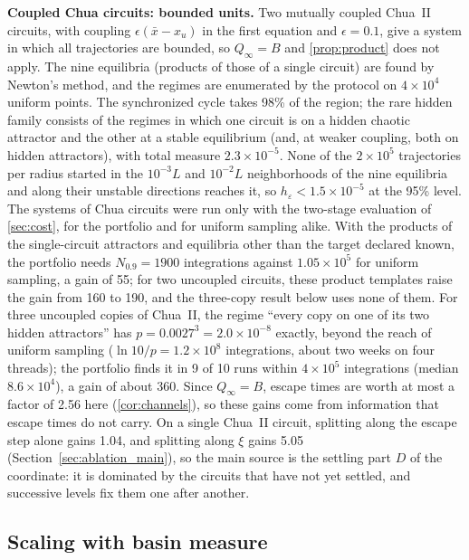 \textbf{Coupled Chua circuits: bounded units.} Two mutually coupled Chua~II circuits, with coupling $\epsilon(\bar x-x_u)$ in the first equation and $\epsilon=0.1$, give a system in which all trajectories are bounded, so $Q_\infty=B$ and \cref{prop:product} does not apply. The nine equilibria (products of those of a single circuit) are found by Newton's method, and the regimes are enumerated by the protocol on $4\times10^4$ uniform points. The synchronized cycle takes 98\% of the region; the rare hidden family consists of the regimes in which one circuit is on a hidden chaotic attractor and the other at a stable equilibrium (and, at weaker coupling, both on hidden attractors), with total measure $2.3\times10^{-5}$. None of the $2\times10^5$ trajectories per radius started in the $10^{-3}L$ and $10^{-2}L$ neighborhoods of the nine equilibria and along their unstable directions reaches it, so $h_\varepsilon<1.5\times10^{-5}$ at the 95\% level. The systems of Chua circuits were run only with the two-stage evaluation of \cref{sec:cost}, for the portfolio and for uniform sampling alike. With the products of the single-circuit attractors and equilibria other than the target declared known, the portfolio needs $N_{0.9}=1900$ integrations against $1.05\times10^5$ for uniform sampling, a gain of 55; for two uncoupled circuits, these product templates raise the gain from 160 to 190, and the three-copy result below uses none of them. For three uncoupled copies of Chua~II, the regime ``every copy on one of its two hidden attractors'' has $p=0.0027^3=2.0\times10^{-8}$ exactly, beyond the reach of uniform sampling ($\ln10/p=1.2\times10^8$ integrations, about two weeks on four threads); the portfolio finds it in 9 of 10 runs within $4\times10^5$ integrations (median $8.6\times10^4$), a gain of about 360. Since $Q_\infty=B$, escape times are worth at most a factor of 2.56 here (\cref{cor:channels}), so these gains come from information that escape times do not carry. On a single Chua~II circuit, splitting along the escape step alone gains 1.04, and splitting along $\xi$ gains 5.05 (Section~\ref{sec:ablation_main}), so the main source is the settling part $D$ of the coordinate: it is dominated by the circuits that have not yet settled, and successive levels fix them one after another.

\subsection{Scaling with basin measure}\label{sec:scaling_p}


